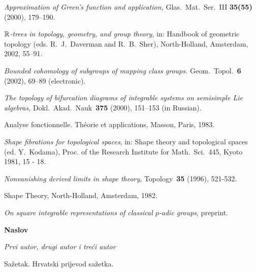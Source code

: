 \documentclass[dvips]{radhazu}
\begin{document}
\begin{thebibliography}{99}

\textit{Approximation of Green's function and application,}
Glas.~Mat.~Ser.~III \textbf{35(55)} (2000), 179--190.

\textit{$\Bbb R$-trees in topology, geometry, and group theory,}
in: Handbook of geometric topology (eds. R.~J.~Daverman and
R.~B.~Sher), North-Holland, Amsterdam, 2002, 55--91.

\textit{Bounded cohomology of subgroups of mapping class groups.}
Geom.~Topol.~\textbf{6} (2002), 69--89 (electronic).

\textit{The topology of bifurcation diagrams of integrable systems
on semisimple Lie algebras,} Dokl.~Akad.~Nauk~\textbf{375} (2000),
151--153 (in Russian).

 Analyse fonctionnelle. Th\'{e}orie
    et applications, Masson, Paris, 1983.

\textit{Shape fibrations for topological spaces}, in: Shape theory
and topological spaces (ed. Y.~Kodama), Proc. of the Research
Institute for Math.~Sci.~445, Kyoto 1981, 15 - 18.

\textit{Nonvanishing derived limits in shape theory},
Topology~\textbf{35} (1996), 521-532.

Shape Theory, North-Holland, Amsterdam, 1982.

\textit{On square integrable representations of classical $p$-adic
groups}, preprint.
\end{thebibliography}

\bigskip

\bigskip

\begin{center}
{\bf Naslov}
\end{center}

\bigskip

\begin{center}
{\it Prvi autor, drugi autor i tre\'ci autor}
\end{center}

\bigskip

\begin{center}
\begin{minipage}[c]{9.2cm}
{\small \hspace*{0.5cm} {\sc Sa\v{z}etak.}
Hrvatski prijevod sa\v{z}etka.}%
\end{minipage}
\end{center}

\endarticle
\end{document}
